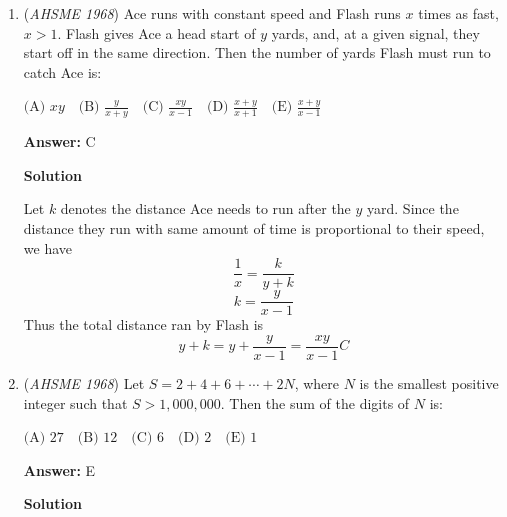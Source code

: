 \begin{enumerate}
 $\text{(A) } 1:3\quad \text{(B) } 1:2\quad \text{(C) } 2:3\quad \text{(D) } 3:4\quad \text{(E) } 1:1$

 \textbf{Answer: }C



\textbf{Solution}

Let the width of the frame on the sides to be $x$.

 Then, the width of the frame on the top and bottom is $2x$.

 The area of the frame is then $x\cdot 2x-18\cdot24$

 Setting the area of the frame equal to the area of the picture,
 \[(2x+18)(4x+24)-18\cdot24 = 18\cdot24\]Solving,
 \[8x^2+120x+432 = 864\]
 \[x^2+15x-54=0\]
 \[(x+18)(x-3)=0\Rightarrow x=3\]

 Therefore, the ratio of the smaller side to the larger side is $\frac{18+2\cdot3}{24+4\cdot3}=\frac{24}{36}=\boxed{2:3 (C)}$.

 


	\item (\textit{AHSME 1968}) Ace runs with constant speed and Flash runs $x$ times as fast, $x>1$. Flash gives Ace a head start of $y$ yards, and, at a given signal, they start off in the same direction. Then the number of yards Flash must run to catch Ace is:


 $\text{(A) } xy\quad \text{(B) } \frac{y}{x+y}\quad \text{(C) } \frac{xy}{x-1}\quad \text{(D) } \frac{x+y}{x+1}\quad \text{(E) } \frac{x+y}{x-1}$

 \textbf{Answer: }C



\textbf{Solution}

Let $k$ denotes the distance Ace needs to run after the $y$ yard. Since the distance they run with same amount of time is proportional to their speed, we have
 \[\frac{1}{x}=\frac{k}{y+k}\]
 \[k=\frac{y}{x-1}\]Thus the total distance ran by Flash is
 \[y+k=y+\frac{y}{x-1}=\frac{xy}{x-1}\boxed{C}\]



	\item (\textit{AHSME 1968}) Let $S=2+4+6+\cdots +2N$, where $N$ is the smallest positive integer such that $S>1,000,000$. Then the sum of the digits of $N$ is:


 $\text{(A) } 27\quad \text{(B) } 12\quad \text{(C) } 6\quad \text{(D) } 2\quad \text{(E) } 1$

 \textbf{Answer: }E



\textbf{Solution}


\end{enumerate}
